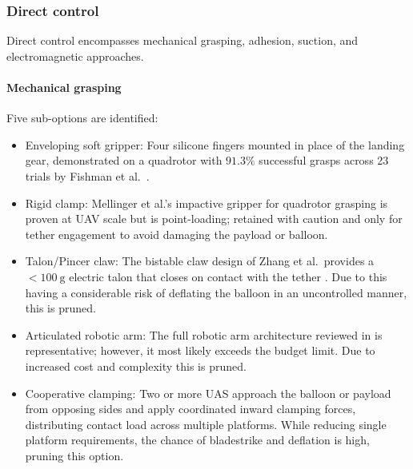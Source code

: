 \subsubsection*{Direct control}

Direct control encompasses mechanical grasping, adhesion, suction, and electromagnetic approaches.
\vspace{-10pt}
\paragraph{Mechanical grasping}
Five sub-options are identified:
\vspace{-8pt}

\begin{itemize}[leftmargin=*]

    \item Enveloping soft gripper: Four silicone fingers mounted in place of the landing gear, demonstrated on a quadrotor with $91.3\%$ successful grasps across 23 trials by Fishman et al.\ \cite{Fishman2021DynamicPractice}.

    \item Rigid clamp: Mellinger et al.'s impactive gripper for quadrotor grasping \cite{Mellinger20112011Systems} is proven at UAV scale but is point-loading; retained with caution and only for tether engagement to avoid damaging the payload or balloon.

    \item Talon/Pincer claw: The bistable claw design of Zhang et al.\ provides a $<\!\SI{100}{\gram}$ electric talon that closes on contact with the tether \cite{Zhao2025DesignDrones}. Due to this having a considerable risk of deflating the balloon in an uncontrolled manner, this is pruned.

    \item Articulated robotic arm: The full robotic arm architecture reviewed in \cite{Ruggiero2018AerialReview} is representative; however, it most likely exceeds the budget limit. Due to increased cost and complexity this is pruned.

    \item Cooperative clamping: Two or more UAS approach the balloon or payload from opposing sides and apply coordinated inward clamping forces, distributing contact load across multiple platforms. While reducing single platform requirements, the chance of bladestrike and deflation is high, pruning this option.

\end{itemize}
\vspace{-15pt}
